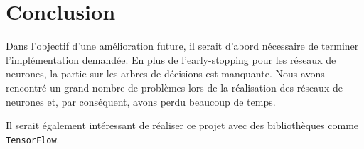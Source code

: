 \chapter{Conclusion}

Dans l'objectif d'une amélioration future, il serait d'abord nécessaire de terminer l'implémentation demandée. En plus de l'early-stopping pour les réseaux de neurones, la partie sur les arbres de décisions est manquante. Nous avons rencontré un grand nombre de problèmes lors de la réalisation des réseaux de neurones et, par conséquent, avons perdu beaucoup de temps.

Il serait également intéressant de réaliser ce projet avec des bibliothèques comme \texttt{TensorFlow}.
